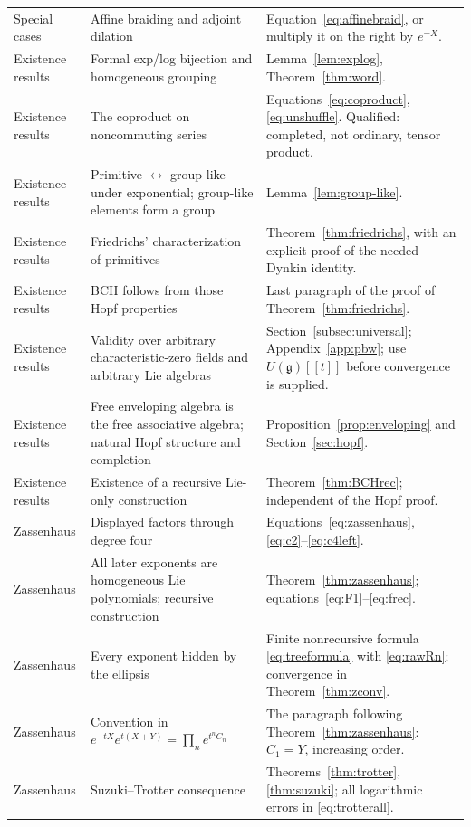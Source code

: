 \documentclass[11pt]{article}
\theoremstyle{definition}
\theoremstyle{remark}
\newcommand{\g}{\mathfrak g}
\numberwithin{equation}{section}
\begin{document}
\begin{longtable}{@{}>{\raggedright\arraybackslash}p{}>{\raggedright\arraybackslash}p{}>{\raggedright\arraybackslash}p{}@{}}
Special cases&Affine braiding and adjoint dilation&Equation~\eqref{eq:affinebraid}, or multiply it on the right by $e^{-X}$.\\
Existence results&Formal exp/log bijection and homogeneous grouping&Lemma~\ref{lem:explog}, Theorem~\ref{thm:word}.\\
Existence results&The coproduct on noncommuting series&Equations~\eqref{eq:coproduct}, \eqref{eq:unshuffle}. Qualified: completed, not ordinary, tensor product.\\
Existence results&Primitive $\leftrightarrow$ group-like under exponential; group-like elements form a group&Lemma~\ref{lem:group-like}.\\
Existence results&Friedrichs' characterization of primitives&Theorem~\ref{thm:friedrichs}, with an explicit proof of the needed Dynkin identity.\\
Existence results&BCH follows from those Hopf properties&Last paragraph of the proof of Theorem~\ref{thm:friedrichs}.\\
Existence results&Validity over arbitrary characteristic-zero fields and arbitrary Lie algebras&Section~\ref{subsec:universal}; Appendix~\ref{app:pbw}; use $U(\g)[[t]]$ before convergence is supplied.\\
Existence results&Free enveloping algebra is the free associative algebra; natural Hopf structure and completion&Proposition~\ref{prop:enveloping} and Section~\ref{sec:hopf}.\\
Existence results&Existence of a recursive Lie-only construction&Theorem~\ref{thm:BCHrec}; independent of the Hopf proof.\\
Zassenhaus&Displayed factors through degree four&Equations~\eqref{eq:zassenhaus}, \eqref{eq:c2}--\eqref{eq:c4left}.\\
Zassenhaus&All later exponents are homogeneous Lie polynomials; recursive construction&Theorem~\ref{thm:zassenhaus}; equations~\eqref{eq:F1}--\eqref{eq:frec}.\\
Zassenhaus&Every exponent hidden by the ellipsis&Finite nonrecursive formula \eqref{eq:treeformula} with \eqref{eq:rawRn}; convergence in Theorem~\ref{thm:zconv}.\\
Zassenhaus&Convention in $e^{-tX}e^{t(X+Y)}=\prod_ne^{t^nC_n}$&The paragraph following Theorem~\ref{thm:zassenhaus}: $C_1=Y$, increasing order.\\
Zassenhaus&Suzuki--Trotter consequence&Theorems~\ref{thm:trotter}, \ref{thm:suzuki}; all logarithmic errors in \eqref{eq:trotterall}.\\

\end{longtable}
\end{document}
